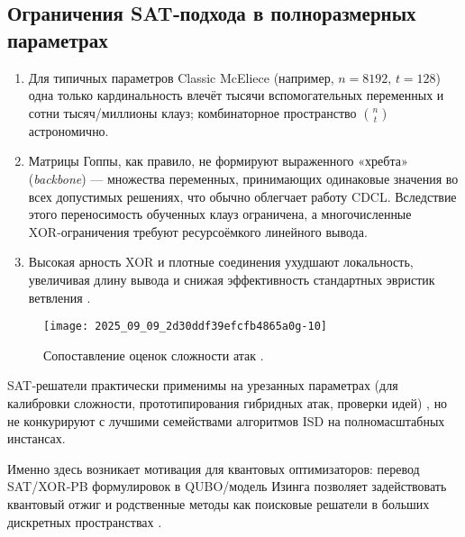 \subsection*{Ограничения SAT‑подхода в полноразмерных параметрах}
\begin{enumerate}
  \item Для типичных параметров Classic McEliece (например, \(n=8192,\, t=128\)) одна только кардинальность влечёт тысячи вспомогательных переменных и сотни тысяч/миллионы клауз; комбинаторное пространство \(\binom{n}{t}\) астрономично.
  \item Матрицы Гоппы, как правило, не формируют выраженного «хребта» (\textit{backbone}) — множества переменных, принимающих одинаковые значения во всех допустимых решениях, что обычно облегчает работу CDCL. Вследствие этого переносимость обученных клауз ограничена, а многочисленные XOR‑ограничения требуют ресурсоёмкого линейного вывода.
  \item Высокая арность XOR и плотные соединения ухудшают локальность, увеличивая длину вывода и снижая эффективность стандартных эвристик ветвления \cite{Im2025}.
\end{enumerate}

\begin{figure}[t]
  \centering
  \texttt{[image: 2025\_09\_09\_2d30ddf39efcfb4865a0g-10]}
  \caption{Сопоставление оценок сложности атак \cite{Grover1996}.}
  \label{fig:attack-complexity}
\end{figure}

SAT‑решатели практически применимы на урезанных параметрах (для калибровки сложности, прототипирования гибридных атак, проверки идей) \cite{Sirdey2023}, но не конкурируют с лучшими семействами алгоритмов ISD на полномасштабных инстансах.

Именно здесь возникает мотивация для квантовых оптимизаторов: перевод SAT/XOR‑PB формулировок в QUBO/модель Изинга позволяет задействовать квантовый отжиг и родственные методы как поисковые решатели в больших дискретных пространствах \cite{Bian2018,Pei2025}.
